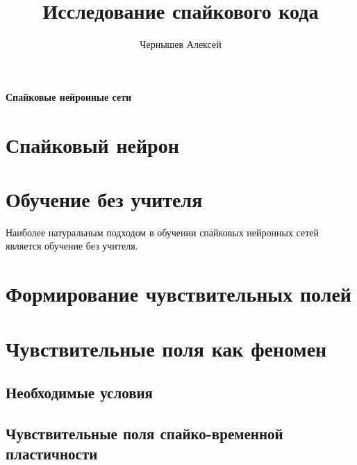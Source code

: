 \documentclass[a4paper,10pt,usenames]{article}
\title{Исследование спайкового кода}
\author{Чернышев Алексей}
\begin{document}
{ \huge \bfseries Спайковые нейронные сети\\[0.4cm] }


\tableofcontents
\clearpage
\section{Спайковый нейрон}
\section{Обучение без учителя}
\indent Наиболее натуральным подходом в обучении спайковых нейронных сетей является обучение без учителя.
\section{Формирование чувствительных полей}
\section{Чувствительные поля как феномен}
\subsection{Необходимые условия}
\subsection{Чувствительные поля спайко-временной пластичности}
\subsection{}
\end{document}
